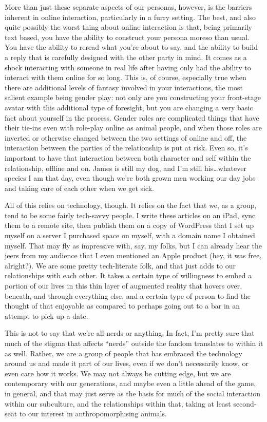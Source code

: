 More than just these separate aspects of our personas, however, is the barriers inherent in online interaction, particularly in a furry setting. The best, and also quite possibly the worst thing about online interaction is that, being primarily text based, you have the ability to construct your persona moreso than usual. You have the ability to reread what you're about to say, and the ability to build a reply that is carefully designed with the other party in mind. It comes as a shock interacting with someone in real life after having only had the ability to interact with them online for so long. This is, of course, especially true when there are additional levels of fantasy involved in your interactions, the most salient example being gender play: not only are you constructing your front-stage avatar with this additional type of foresight, but you are changing a very basic fact about yourself in the process. Gender roles are complicated things that have their tie-ins even with role-play online as animal people, and when those roles are inverted or otherwise changed between the two settings of online and off, the interaction between the parties of the relationship is put at risk. Even so, it's important to have that interaction between both character and self within the relationship, offline and on. James is still my dog, and I'm still his\ldots{}whatever species I am that day, even though we're both grown men working our day jobs and taking care of each other when we get sick.

All of this relies on technology, though. It relies on the fact that we, as a group, tend to be some fairly tech-savvy people. I write these articles on an iPad, sync them to a remote site, then publish them on a copy of WordPress that I set up myself on a server I purchased space on myself, with a domain name I obtained myself. That may fly as impressive with, say, my folks, but I can already hear the jeers from my audience that I even mentioned an Apple product (hey, it was free, alright?). We are some pretty tech-literate folk, and that just adds to our relationships with each other. It takes a certain type of willingness to embed a portion of our lives in this thin layer of augmented reality that hovers over, beneath, and through everything else, and a certain type of person to find the thought of that enjoyable as compared to perhaps going out to a bar in an attempt to pick up a date.

This is not to say that we're all nerds or anything. In fact, I'm pretty sure that much of the stigma that affects ``nerds'' outside the fandom translates to within it as well. Rather, we are a group of people that has embraced the technology around us and made it part of our lives, even if we don't necessarily know, or even care how it works. We may not always be cutting edge, but we are contemporary with our generations, and maybe even a little ahead of the game, in general, and that may just serve as the basis for much of the social interaction within our subculture, and the relationships within that, taking at least second-seat to our interest in anthropomorphising animals.

